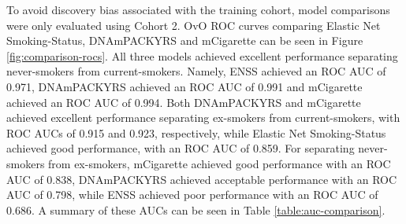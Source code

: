 \documentclass{article} %
\begin{document}

To avoid discovery bias associated with the training cohort, model comparisons were only evaluated using Cohort 2. OvO ROC curves comparing Elastic Net Smoking-Status, DNAmPACKYRS and mCigarette can be seen in Figure \ref{fig:comparison-rocs}. All three models achieved excellent performance separating never-smokers from current-smokers. Namely, ENSS achieved an ROC AUC of 0.971, DNAmPACKYRS achieved an ROC AUC of 0.991 and mCigarette achieved an ROC AUC of 0.994. Both DNAmPACKYRS and mCigarette achieved excellent performance separating ex-smokers from current-smokers, with ROC AUCs of 0.915 and 0.923, respectively, while Elastic Net Smoking-Status achieved good performance, with an ROC AUC of 0.859. For separating never-smokers from ex-smokers, mCigarette achieved good performance with an ROC AUC of 0.838, DNAmPACKYRS achieved acceptable performance with an ROC AUC of 0.798, while ENSS achieved poor performance with an ROC AUC of 0.686. A summary of these AUCs can be seen in Table \ref{table:auc-comparison}.
\end{document}
